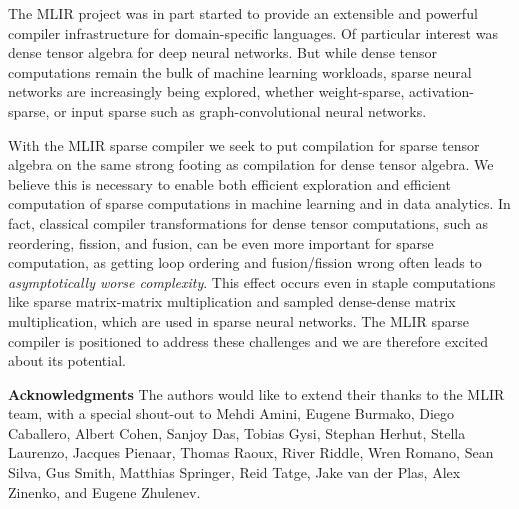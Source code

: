 \documentclass[10pt]{article}
\begin{document}
The MLIR project was in part started to provide an extensible and powerful compiler infrastructure for domain-specific languages. Of particular interest was dense tensor algebra for deep neural networks. But while dense tensor computations remain the bulk of machine learning workloads, sparse neural networks are increasingly being explored, whether weight-sparse, activation-sparse, or input sparse such as graph-convolutional neural networks.

With the MLIR sparse compiler we seek to put compilation for sparse tensor algebra on the same strong footing as compilation for dense tensor algebra. We believe this is necessary to enable both efficient exploration and efficient computation of sparse computations in machine learning and in data analytics. In fact, classical compiler transformations for dense tensor computations, such as reordering, fission, and fusion, can be even more important for sparse computation, as getting loop ordering and fusion/fission wrong often leads to \emph{asymptotically worse complexity}. This effect occurs even in staple computations like sparse matrix-matrix multiplication and sampled dense-dense matrix multiplication, which are used in sparse neural networks. The MLIR sparse compiler is positioned to address these challenges and we are therefore excited about its potential.

\textbf{Acknowledgments} The authors would like to extend their thanks to the MLIR team, with a special shout-out to Mehdi Amini, Eugene Burmako, Diego Caballero, Albert Cohen, Sanjoy Das, Tobias Gysi, Stephan Herhut, Stella Laurenzo, Jacques Pienaar, Thomas Raoux, River Riddle, Wren Romano, Sean Silva, Gus Smith, Matthias Springer, Reid Tatge, Jake van der Plas, Alex Zinenko, and Eugene Zhulenev.



\end{document}
